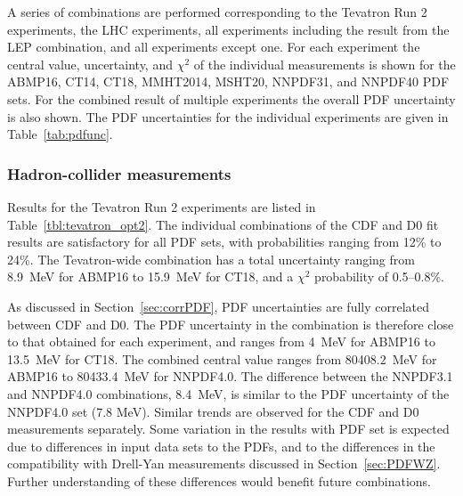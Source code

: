 
A series of combinations are performed corresponding to the Tevatron Run 2 experiments, the LHC experiments, 
all experiments including the result from the LEP combination, and all experiments except one.  For each 
experiment the central value, uncertainty, and $\chi^2$ of the individual measurements is shown for 
the ABMP16, CT14, CT18, MMHT2014, MSHT20, NNPDF31, and NNPDF40 PDF sets.  For the combined result of 
multiple experiments the overall PDF uncertainty is also shown.  The PDF uncertainties for the individual 
experiments are given in Table~\ref{tab:pdfunc}.


\subsubsection{Hadron-collider measurements}

Results for the Tevatron Run 2 experiments are listed in Table~\ref{tbl:tevatron_opt2}. The individual 
combinations of the CDF and D0 fit results are satisfactory for all PDF sets, with probabilities ranging
from 12\% to 24\%.  The Tevatron-wide combination has a total uncertainty ranging from 8.9~MeV for ABMP16
to 15.9~MeV for CT18, and a $\chi^2$ probability of 0.5--0.8\%.

As discussed in Section~\ref{sec:corrPDF}, PDF uncertainties are fully correlated between CDF and D0. 
The PDF uncertainty in the combination is therefore close to that obtained for each experiment, and 
ranges from 4~MeV for ABMP16 to 13.5~MeV for CT18. The combined central value ranges from 80408.2~MeV 
for ABMP16 to 80433.4~MeV for NNPDF4.0.  The difference between the NNPDF3.1 and NNPDF4.0 combinations, 
8.4~MeV, is similar to the PDF uncertainty of the NNPDF4.0 set (7.8 MeV).  Similar trends are observed 
for the CDF and D0 measurements separately.  Some variation in the results with PDF set is expected due
to differences in input data sets to the PDFs, and to the differences in the compatibility with Drell-Yan
measurements discussed in Section~\ref{sec:PDFWZ}.  Further understanding of these differences would benefit
future combinations.

\begin{table}[!tp]
  \centering
  
  \caption{The CDF and D0 Run 2 $m_W$ and $\chi^2$ values obtained from a combination of the individual
  measurement distributions and decay channels, along with the combined Tevatron Run 2 $m_W$, PDF uncertainty,
  $\chi^2$, and probability of obtaining this $\chi^2$ or larger.  Mass units are in MeV.
}
\label{tbl:tevatron_opt2}
\end{table}

